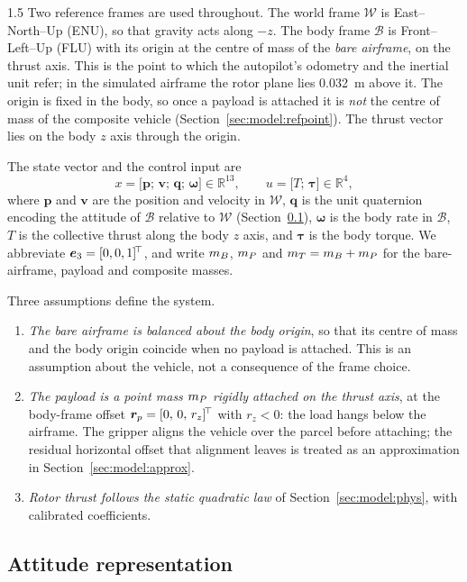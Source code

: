 \begin{spacing}{1.5}
Two reference frames are used throughout. The world frame $\mathcal{W}$ is
East--North--Up (ENU), so that gravity acts along $-z$. The body frame
$\mathcal{B}$ is Front--Left--Up (FLU) with its origin at the centre of mass of
the \emph{bare airframe}, on the thrust axis. This is the point to which the
autopilot's odometry and the inertial unit refer; in the simulated airframe the
rotor plane lies \SI{0.032}{\meter} above it. The origin is fixed in the body,
so once a payload is attached it is \emph{not} the centre of mass of the
composite vehicle (Section~\ref{sec:model:refpoint}). The thrust vector lies on
the body $z$ axis through the origin.

The state vector and the control input are
\begin{equation}
x = \bigl[\bm{p};\, \bm{v};\, \bm{q};\, \bm{\omega}\bigr] \in \mathbb{R}^{13},
\qquad
u = \bigl[T;\, \bm{\tau}\bigr] \in \mathbb{R}^{4},
\label{eq:state}
\end{equation}
where $\bm{p}$ and $\bm{v}$ are the position and velocity in $\mathcal{W}$,
$\bm{q}$ is the unit quaternion encoding the attitude of $\mathcal{B}$ relative
to $\mathcal{W}$ (Section~\ref{sec:model:quat}),
$\bm{\omega}$ is the body rate in $\mathcal{B}$, $T$ is the collective thrust
along the body $z$ axis, and $\bm{\tau}$ is the body torque. We abbreviate
$\bm{e}_3 = [0,0,1]^{\!\top}$, and write $m_B$, $m_P$ and $m_T=m_B+m_P$ for the
bare-airframe, payload and composite masses.

Three assumptions define the system.
\begin{enumerate}
\item \emph{The bare airframe is balanced about the body origin}, so that its
centre of mass and the body origin coincide when no payload is attached. This is
an assumption about the vehicle, not a consequence of the frame choice.
\item \emph{The payload is a point mass $m_P$ rigidly attached on the thrust
axis}, at the body-frame offset $\bm{r}_p = [0,\,0,\,r_z]^{\!\top}$ with $r_z<0$: the
load hangs below the airframe. The gripper aligns the vehicle over the parcel
before attaching; the residual horizontal offset that alignment leaves is
treated as an approximation in Section~\ref{sec:model:approx}.
\item \emph{Rotor thrust follows the static quadratic law} of
Section~\ref{sec:model:phys}, with calibrated coefficients.
\end{enumerate}

\subsection{Attitude representation}\label{sec:model:quat}


\end{spacing}
